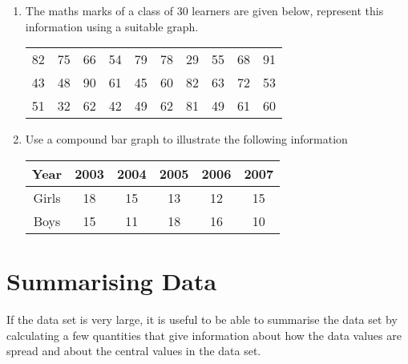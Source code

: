 \documentclass[10pt,a4paper,titlepage,twoside,openright]{report}
\begin{document}
\begin{enumerate}
\item{The maths marks of a class of 30 learners are given below, represent this information using a suitable graph.

\begin{center}
\begin{tabular}{c c c c c c c c c c}
82 & 75 & 66 & 54 & 79 & 78 & 29 & 55 & 68 & 91 \\
43 & 48 & 90 & 61 & 45 & 60 & 82 & 63 & 72 & 53 \\
51 & 32 & 62 & 42 & 49 & 62 & 81 & 49 & 61 & 60 \\
\end{tabular}
\end{center}
}

\item{Use a compound bar graph to illustrate the following information

\begin{center}
\begin{tabular}{|c|c|c|c|c|c|}\hline
Year & 2003 & 2004 & 2005 & 2006 & 2007 \\\hline
Girls & 18 & 15 & 13 & 12 & 15 \\\hline
Boys & 15 & 11 & 18 & 16 & 10 \\\hline
\end{tabular}
\end{center}
}

\end{enumerate}

\section{Summarising Data}

If the data set is very large, it is useful to be able to summarise the data set by calculating a few quantities that give information about how the data values are spread and about the central values in the data set.
\end{document}
